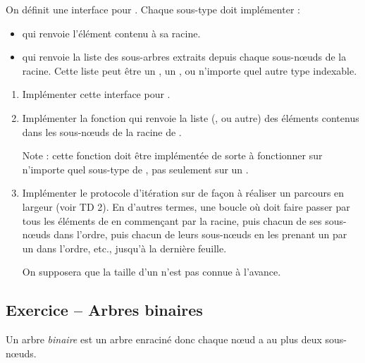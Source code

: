 \documentclass{article}
\newcounter{loop}
\newcounter{numEx}
\newcommand{\exo}[1]{
	\stepcounter{numEx}
	\setcounter{loop}{0}
	\subsection*{Exercice \arabic{numEx} -- #1}
}
\begin{document}
\noindent On définit une interface pour . Chaque sous-type doit implémenter :
\begin{itemize}
	\item {} qui renvoie l'élément contenu à sa racine.
	\item {} qui renvoie la liste des sous-arbres extraits depuis chaque sous-nœuds de la racine. Cette liste peut être un , un , ou n'importe quel autre type indexable.
\end{itemize}

\begin{enumerate}[resume]
	\item Implémenter cette interface pour .
	
	\item Implémenter la fonction  qui renvoie la liste (,  ou autre) des éléments contenus dans les sous-nœuds de la racine de .
	
	Note : cette fonction doit être implémentée de sorte à fonctionner sur n'importe quel sous-type de , pas seulement sur un .
	
	\item Implémenter le protocole d'itération sur  de façon à réaliser un parcours en largeur (voir TD 2). En d'autres termes, une boucle  où  doit faire passer  par tous les éléments de  en commençant par la racine, puis chacun de ses sous-nœuds dans l'ordre, puis chacun de leurs sous-nœuds en les prenant un par un dans l'ordre, etc., jusqu'à la dernière feuille.
	
	On supposera que la taille d'un  n'est pas connue à l'avance.
\end{enumerate}

\exo{Arbres binaires}

Un arbre \emph{binaire} est un arbre enraciné donc chaque nœud a au plus deux sous-nœuds.
\end{document}
